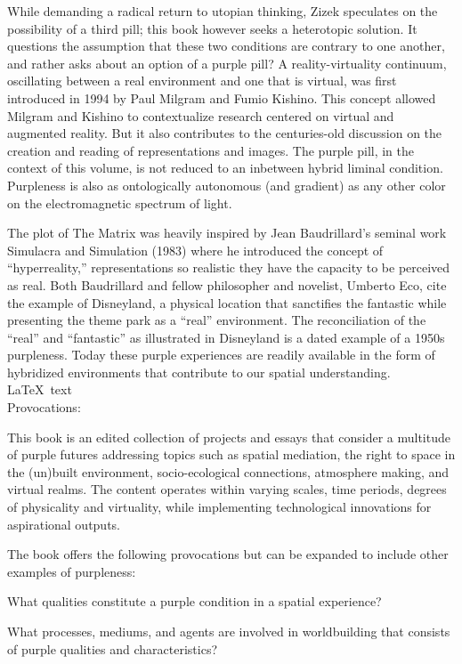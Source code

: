 \documentclass{article}
\begin{document}
While demanding a radical return to utopian thinking, Zizek speculates on the possibility of a third pill; this book however seeks a heterotopic solution. It questions the assumption that these two conditions are contrary to one another, and rather asks about an option of a purple pill? A reality-virtuality continuum, oscillating between a real environment and one that is virtual, was first introduced in 1994 by Paul Milgram and Fumio Kishino. This concept allowed Milgram and Kishino to contextualize research centered on virtual and augmented reality. But it also contributes to the centuries-old discussion on the creation and reading of representations and images. The purple pill, in the context of this volume, is not reduced to an inbetween hybrid liminal condition. Purpleness is also as ontologically autonomous (and gradient) as any other color on the electromagnetic spectrum of light.


The plot of The Matrix was heavily inspired by Jean Baudrillard's seminal work Simulacra and Simulation (1983) where he introduced the concept of “hyperreality,” representations so realistic they have the capacity to be perceived as real. Both Baudrillard and fellow philosopher and novelist, Umberto Eco, cite the example of Disneyland, a physical location that sanctifies the fantastic while presenting the theme park as a “real” environment. The reconciliation of the “real” and “fantastic” as illustrated in Disneyland is a dated example of a 1950s purpleness. Today these purple experiences are readily available in the form of hybridized environments that contribute to our spatial understanding. {\color{blue}\LaTeX\ text} \\ 

Provocations:

This book is an edited collection of projects and essays that consider a multitude of purple futures addressing topics such as spatial mediation, the right to space in the (un)built environment, socio-ecological connections, atmosphere making, and virtual realms. The content operates within varying scales, time periods, degrees of physicality and virtuality, while implementing technological innovations for aspirational outputs.


The book offers the following provocations but can be expanded to include other examples of purpleness:

What qualities constitute a purple condition in a spatial experience?

What processes, mediums, and agents are involved in worldbuilding that consists of purple qualities and characteristics?
\end{document}
